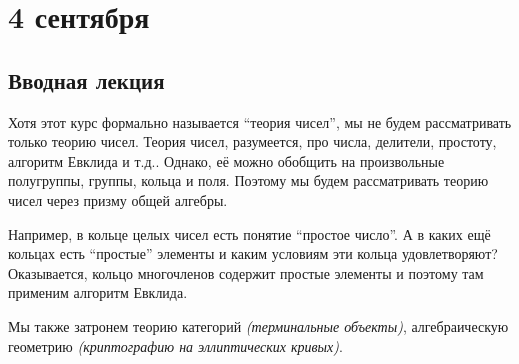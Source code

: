 \chapter{4 сентября}

\section{Вводная лекция}

Хотя этот курс формально называется ``теория чисел'', мы не будем рассматривать только теорию чисел. Теория чисел, разумеется, про числа, делители, простоту, алгоритм Евклида и т.д.. Однако, её можно обобщить на произвольные полугруппы, группы, кольца и поля. Поэтому мы будем рассматривать теорию чисел через призму общей алгебры.

Например, в кольце целых чисел есть понятие ``простое число''. А в каких ещё кольцах есть ``простые'' элементы и каким условиям эти кольца удовлетворяют? Оказывается, кольцо многочленов содержит простые элементы и поэтому там применим алгоритм Евклида.

Мы также затронем теорию категорий \textit{(терминальные объекты)}, алгебраическую геометрию \textit{(криптографию на эллиптических кривых)}.
